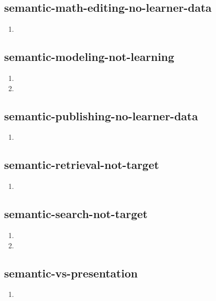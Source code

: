 \documentclass{article}
\begin{document}
\subsection{semantic-math-editing-no-learner-data}
\begin{enumerate}
\item {}
\end{enumerate}

\subsection{semantic-modeling-not-learning}
\begin{enumerate}
\item {}
\item {}
\end{enumerate}

\subsection{semantic-publishing-no-learner-data}
\begin{enumerate}
\item {}
\end{enumerate}

\subsection{semantic-retrieval-not-target}
\begin{enumerate}
\item {}
\end{enumerate}

\subsection{semantic-search-not-target}
\begin{enumerate}
\item {}
\item {}
\end{enumerate}

\subsection{semantic-vs-presentation}
\begin{enumerate}
\item {}
\end{enumerate}
\end{document}
